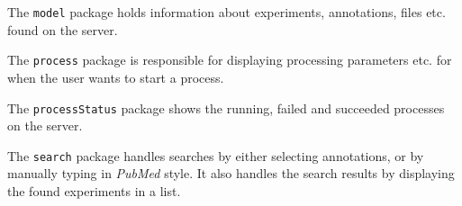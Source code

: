 	The \verb!model! package holds information about experiments, annotations, files etc. found on the server.
	
	The \verb!process! package is responsible for displaying processing parameters etc. for when the user wants to start a process.

	The \verb!processStatus! package shows the running, failed and succeeded processes on the server.
	
	The \verb!search! package handles searches by either selecting annotations, or by manually typing in \textit{PubMed} style. It also handles the search results by displaying the found experiments in a list.
	


